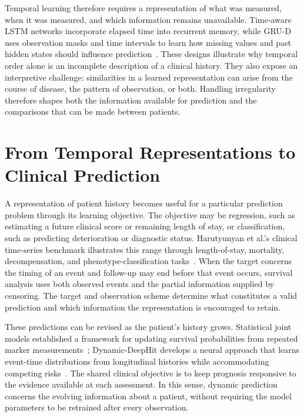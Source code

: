 Temporal learning therefore requires a representation of what was measured, when it was measured, and which information remains unavailable. Time-aware LSTM networks incorporate elapsed time into recurrent memory, while GRU-D uses observation masks and time intervals to learn how missing values and past hidden states should influence prediction~\cite{baytas2017tlstm,che2018grud}. These designs illustrate why temporal order alone is an incomplete description of a clinical history. They also expose an interpretive challenge: similarities in a learned representation can arise from the course of disease, the pattern of observation, or both. Handling irregularity therefore shapes both the information available for prediction and the comparisons that can be made between patients.

\section{From Temporal Representations to Clinical Prediction}

A representation of patient history becomes useful for a particular prediction problem through its learning objective. The objective may be regression, such as estimating a future clinical score or remaining length of stay, or classification, such as predicting deterioration or diagnostic status. Harutyunyan et al.'s clinical time-series benchmark illustrates this range through length-of-stay, mortality, decompensation, and phenotype-classification tasks~\cite{harutyunyan2019benchmark}. When the target concerns the timing of an event and follow-up may end before that event occurs, survival analysis uses both observed events and the partial information supplied by censoring. The target and observation scheme determine what constitutes a valid prediction and which information the representation is encouraged to retain.

These predictions can be revised as the patient's history grows. Statistical joint models established a framework for updating survival probabilities from repeated marker measurements~\cite{rizopoulos2011dynamic}; Dynamic-DeepHit develops a neural approach that learns event-time distributions from longitudinal histories while accommodating competing risks~\cite{lee2020dynamicdeephit}. The shared clinical objective is to keep prognosis responsive to the evidence available at each assessment. In this sense, dynamic prediction concerns the evolving information about a patient, without requiring the model parameters to be retrained after every observation.

